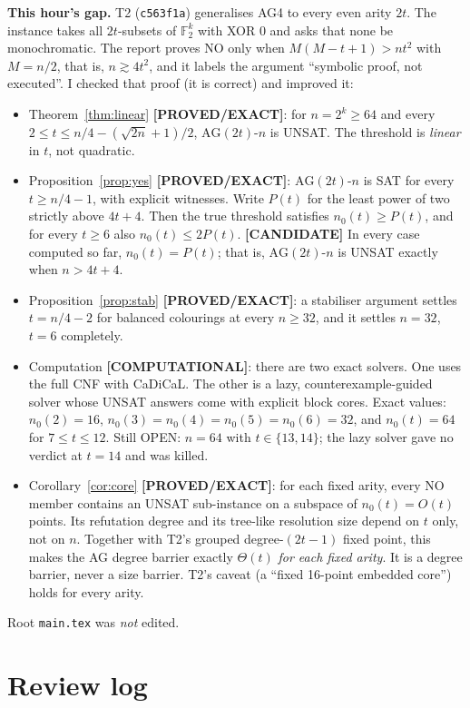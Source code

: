 \documentclass[11pt]{article}
\theoremstyle{definition}
\theoremstyle{remark}
\newcommand{\lab}[1]{\textbf{[#1]}}
\newcommand{\F}{\mathbb{F}}
\newcommand{\AG}{\mathrm{AG}}
\begin{document}
\textbf{This hour's gap.} T2 (\texttt{c563f1a}) generalises AG4 to every even arity $2t$. The
instance takes all $2t$-subsets of $\F_2^k$ with XOR $0$ and asks that none be monochromatic.
The report proves NO only when $M(M-t+1)>nt^2$ with $M=n/2$, that is, $n\gtrsim 4t^2$, and it
labels the argument ``symbolic proof, not executed''. I checked that proof (it is correct) and
improved it:
\begin{itemize}
\item Theorem~\ref{thm:linear} \lab{PROVED/EXACT}: for $n=2^k\ge 64$ and every
$2\le t\le n/4-(\sqrt{2n}+1)/2$, $\AG(2t)$-$n$ is UNSAT. The threshold is \emph{linear} in
$t$, not quadratic.
\item Proposition~\ref{prop:yes} \lab{PROVED/EXACT}: $\AG(2t)$-$n$ is SAT for every
$t\ge n/4-1$, with explicit witnesses. Write $P(t)$ for the least power of two strictly above $4t+4$. Then the true
threshold satisfies $n_0(t)\ge P(t)$, and for every $t\ge 6$ also $n_0(t)\le 2P(t)$.
\lab{CANDIDATE} In every case computed so far, $n_0(t)=P(t)$; that is, $\AG(2t)$-$n$ is
UNSAT exactly when $n>4t+4$.
\item Proposition~\ref{prop:stab} \lab{PROVED/EXACT}: a stabiliser argument settles
$t=n/4-2$ for balanced colourings at every $n\ge 32$, and it settles $n=32$, $t=6$ completely.
\item Computation \lab{COMPUTATIONAL}: there are two exact solvers. One uses the full CNF with
CaDiCaL. The other is a lazy, counterexample-guided solver whose UNSAT answers come with
explicit block cores. Exact values: $n_0(2)=16$, $n_0(3)=n_0(4)=n_0(5)=n_0(6)=32$, and
$n_0(t)=64$ for $7\le t\le 12$. Still OPEN: $n=64$ with $t\in\{13,14\}$; the lazy solver gave no
verdict at $t=14$ and was killed.
\item Corollary~\ref{cor:core} \lab{PROVED/EXACT}: for each fixed arity, every NO member
contains an UNSAT sub-instance on a subspace of $n_0(t)=O(t)$ points. Its refutation degree
and its tree-like resolution size depend on $t$ only, not on $n$. Together with T2's grouped
degree-$(2t-1)$ fixed point, this makes the AG degree barrier exactly $\Theta(t)$ \emph{for
each fixed arity}. It is a degree barrier, never a size barrier. T2's caveat (a ``fixed
16-point embedded core'') holds for every arity.
\end{itemize}
Root \texttt{main.tex} was \emph{not} edited.

\section{Review log}
\end{document}

